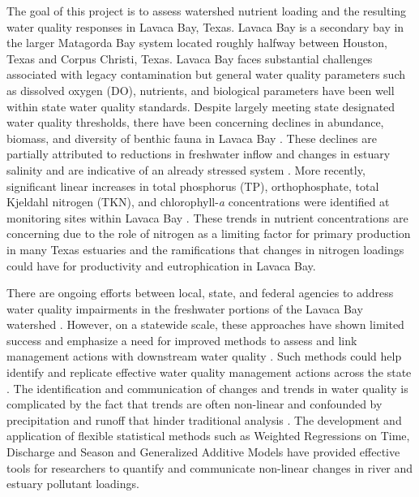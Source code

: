 \documentclass[fleqn,10pt,lineno]{wlpeerj} %
\begin{document}
The goal of this project is to assess watershed nutrient loading and the
resulting water quality responses in Lavaca Bay, Texas. Lavaca Bay is a
secondary bay in the larger Matagorda Bay system located roughly halfway
between Houston, Texas and Corpus Christi, Texas. Lavaca Bay faces
substantial challenges associated with legacy contamination but general
water quality parameters such as dissolved oxygen (DO), nutrients, and
biological parameters have been well within state water quality
standards. Despite largely meeting state designated water quality
thresholds, there have been concerning declines in abundance, biomass,
and diversity of benthic fauna in Lavaca Bay
\autocite{beserespollackLongtermTrendsResponse2011}. These declines are
partially attributed to reductions in freshwater inflow and changes in
estuary salinity and are indicative of an already stressed system
\autocite{beserespollackLongtermTrendsResponse2011,palmerImpactsDroughtsLow2015,montagnaAssessmentRelationshipFreshwater2020}.
More recently, significant linear increases in total phosphorus (TP),
orthophosphate, total Kjeldahl nitrogen (TKN), and chlorophyll-\emph{a}
concentrations were identified at monitoring sites within Lavaca Bay
\autocite{bugica_water_2020}. These trends in nutrient concentrations
are concerning due to the role of nitrogen as a limiting factor for
primary production in many Texas estuaries
\autocite{gardnerNitrogenFixationDissimilatory2006,houTransformationFateNitrate2012,doradoUnderstandingInteractionsFreshwater2015,paudelRelationshipSuspendedSolids2019,wetz_exceptionally_2017}
and the ramifications that changes in nitrogen loadings could have for
productivity and eutrophication in Lavaca Bay.

There are ongoing efforts between local, state, and federal agencies to
address water quality impairments in the freshwater portions of the
Lavaca Bay watershed
\autocite{jainTechnicalSupportDocument2021,schrammLavacaRiverWatershed2018,bertholdDirectMailingEducation2021}.
However, on a statewide scale, these approaches have shown limited
success and emphasize a need for improved methods to assess and link
management actions with downstream water quality
\autocite{schrammTotalMaximumDaily2022}. Such methods could help
identify and replicate effective water quality management actions across
the state . The identification and communication of changes and trends
in water quality is complicated by the fact that trends are often
non-linear and confounded by precipitation and runoff that hinder
traditional analysis
\autocite{wazniakLinkingWaterQuality2007,lloydMethodsDetectingChange2014}.
The development and application of flexible statistical methods such as
Weighted Regressions on Time, Discharge and Season
\autocite[WRTDS,][]{hirschWeightedRegressionsTime2010} and Generalized
Additive Models \autocite[GAMs,][]{woodFastStableRestricted2011} have
provided effective tools for researchers to quantify and communicate
non-linear changes in river and estuary pollutant loadings.
\end{document}
